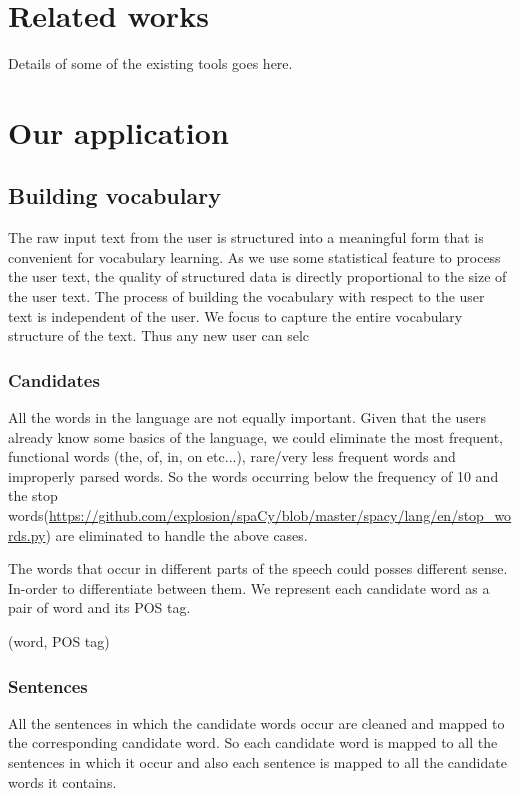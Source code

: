 \documentclass[11pt,a4paper]{article}
\begin{document}
\section{Related works}
Details of some of the existing tools goes here.


\section{Our application}

\subsection{Building vocabulary}
The raw input text from the user is structured into a meaningful form that is
convenient for vocabulary learning. As we use some statistical feature to
process the user text, the quality of structured data is directly
proportional to the size of the user text. The process of building the
vocabulary with respect to the user text is independent of the user. We focus
to capture the entire vocabulary structure of the text. Thus any new user can
selc

\subsubsection{Candidates}
All the words in the language are not equally important. Given that the users
already know some basics of the language, we could eliminate the most frequent, 
functional words (the, of, in, on etc...), rare/very less frequent words and
improperly parsed words. So the words occurring below the frequency of 10 and
the stop words(\url{https://github.com/explosion/spaCy/blob/master/spacy/lang/en/stop_words.py}) are eliminated to handle the above cases. 

The words that occur in different parts of the speech could posses different sense.
In-order to differentiate between them. We represent each candidate word as a
pair of word and its POS tag.
\begin{center}(word, POS tag)\end{center}

\subsubsection{Sentences}
All the sentences in which the candidate words occur are cleaned and mapped to
the corresponding candidate word. So each candidate word is mapped to all the sentences
in which it occur and also each sentence is mapped to all the candidate
words it contains.
\end{document}
